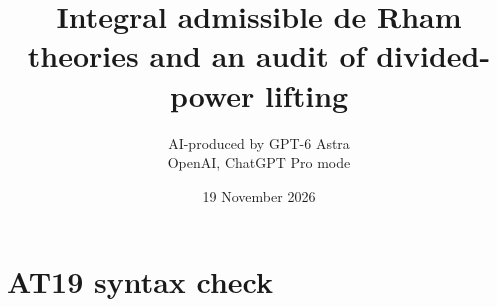 \documentclass[11pt,a4paper]{article}
\title{Integral admissible de Rham theories and an audit of divided-power lifting}
\author{AI-produced by GPT-6 Astra\\OpenAI, ChatGPT Pro mode}
\date{19 November 2026}
\theoremstyle{definition}
\begin{document}
\section{AT19 syntax check}

\end{document}
